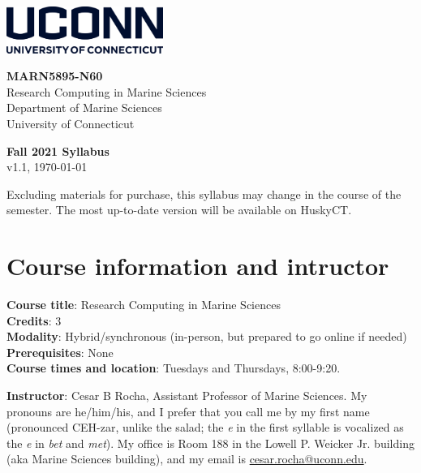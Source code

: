 \documentclass[11pt]{article}
\begin{document}
\parbox{.5\linewidth}
{
\begin{flushleft}
\includegraphics[height=0.6in]{uconn-wordmark-stacked-blue}\\
\vspace{1em}
\end{flushleft}
}
\parbox{.5\linewidth}
{
\begin{flushright}
{\bf MARN5895-N60 }\\
    Research Computing in Marine Sciences\\
    \vspace{.1cm}
{\footnotesize Department of Marine Sciences\\
University of Connecticut\\
}
\end{flushright}
}

\vspace{1em}

%
%
\begin{center}
\textbf{Fall 2021 Syllabus}\\
{\footnotesize v1.1, \today}
\end{center}
\vspace{-.6cm}
{\footnotesize Excluding materials for purchase, this syllabus may change in the course of the semester. The most up-to-date version will be available on HuskyCT.}

\section*{Course information and intructor}

\textbf{Course title}:  Research Computing in Marine Sciences\\
\textbf{Credits}:  3\\
\textbf{Modality}:  Hybrid/synchronous (in-person, but prepared to go online if needed)\\
\textbf{Prerequisites}:  None\\
\textbf{Course times and location}: Tuesdays and Thursdays, 8:00-9:20.

\bigskip

\textbf{Instructor}: Cesar B Rocha, Assistant Professor  of Marine Sciences. My
pronouns are he/him/his, and I prefer that you call me by my first name (pronounced
{CEH-zar}, unlike the salad; the \emph{e} in the first syllable is vocalized
as the \textit{e} in \emph{bet} and \emph{met}).  My office is Room 188 in the
Lowell P. Weicker Jr. building (aka Marine Sciences building), and my email is  \href{mailto:cesar.rocha@uconn.edu}{cesar.rocha@uconn.edu}.
\end{document}
